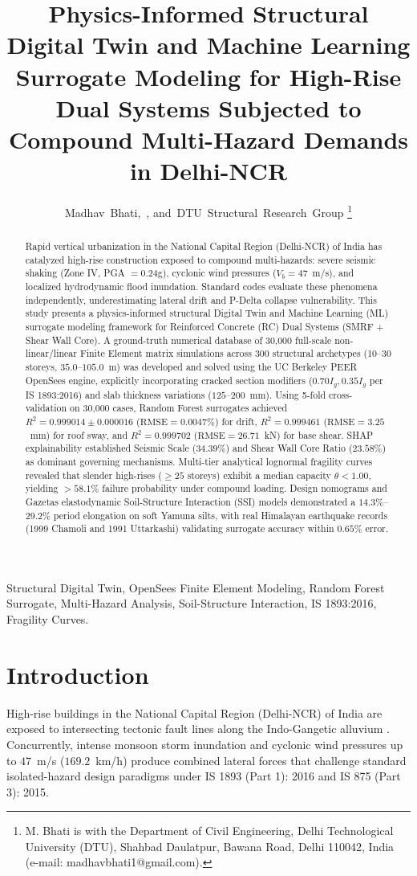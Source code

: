 \documentclass[journal,10pt,twocolumn]{IEEEtran}
\title{Physics-Informed Structural Digital Twin and Machine Learning Surrogate Modeling for High-Rise Dual Systems Subjected to Compound Multi-Hazard Demands in Delhi-NCR}
\author{Madhav~Bhati,~\IEEEmembership{Student Member,~ASCE}, and~DTU~Structural~Research~Group%
\thanks{M. Bhati is with the Department of Civil Engineering, Delhi Technological University (DTU), Shahbad Daulatpur, Bawana Road, Delhi 110042, India (e-mail: madhavbhati1@gmail.com).}%
}
\begin{document}
\maketitle

\begin{abstract}
Rapid vertical urbanization in the National Capital Region (Delhi-NCR) of India has catalyzed high-rise construction exposed to compound multi-hazards: severe seismic shaking (Zone IV, PGA $= 0.24$g), cyclonic wind pressures ($V_b = 47$~m/s), and localized hydrodynamic flood inundation. Standard codes evaluate these phenomena independently, underestimating lateral drift and P-Delta collapse vulnerability. This study presents a physics-informed structural Digital Twin and Machine Learning (ML) surrogate modeling framework for Reinforced Concrete (RC) Dual Systems (SMRF + Shear Wall Core). A ground-truth numerical database of 30,000 full-scale non-linear/linear Finite Element matrix simulations across 300 structural archetypes (10--30 storeys, $35.0$--$105.0$~m) was developed and solved using the UC Berkeley PEER OpenSees engine, explicitly incorporating cracked section modifiers ($0.70 I_g, 0.35 I_g$ per IS 1893:2016) and slab thickness variations ($125$--$200$~mm). Using 5-fold cross-validation on 30,000 cases, Random Forest surrogates achieved $R^2 = 0.999014 \pm 0.000016$ ($\text{RMSE} = 0.0047\%$) for drift, $R^2 = 0.999461$ ($\text{RMSE} = 3.25$~mm) for roof sway, and $R^2 = 0.999702$ ($\text{RMSE} = 26.71$~kN) for base shear. SHAP explainability established Seismic Scale ($34.39\%$) and Shear Wall Core Ratio ($23.58\%$) as dominant governing mechanisms. Multi-tier analytical lognormal fragility curves revealed that slender high-rises ($\ge 25$ storeys) exhibit a median capacity $\theta < 1.00$, yielding $>58.1\%$ failure probability under compound loading. Design nomograms and Gazetas elastodynamic Soil-Structure Interaction (SSI) models demonstrated a $14.3\%$--$29.2\%$ period elongation on soft Yamuna silts, with real Himalayan earthquake records (1999 Chamoli and 1991 Uttarkashi) validating surrogate accuracy within $0.65\%$ error.
\end{abstract}

\begin{IEEEkeywords}
Structural Digital Twin, OpenSees Finite Element Modeling, Random Forest Surrogate, Multi-Hazard Analysis, Soil-Structure Interaction, IS 1893:2016, Fragility Curves.
\end{IEEEkeywords}

\section{Introduction}
High-rise buildings in the National Capital Region (Delhi-NCR) of India are exposed to intersecting tectonic fault lines along the Indo-Gangetic alluvium \cite{iyengar2000}. Concurrently, intense monsoon storm inundation and cyclonic wind pressures up to $47$~m/s ($169.2$~km/h) produce combined lateral forces that challenge standard isolated-hazard design paradigms under IS 1893 (Part 1): 2016 and IS 875 (Part 3): 2015. 
\end{document}

